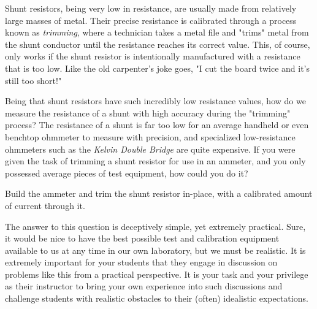 

Shunt resistors, being very low in resistance, are usually made from relatively large masses of metal.  Their precise resistance is calibrated through a process known as {\it trimming}, where a technician takes a metal file and "trims" metal from the shunt conductor until the resistance reaches its correct value.  This, of course, only works if the shunt resistor is intentionally manufactured with a resistance that is too low.  Like the old carpenter's joke goes, "I cut the board twice and it's still too short!"

Being that shunt resistors have such incredibly low resistance values, how do we measure the resistance of a shunt with high accuracy during the "trimming" process?  The resistance of a shunt is far too low for an average handheld or even benchtop ohmmeter to measure with precision, and specialized low-resistance ohmmeters such as the {\it Kelvin Double Bridge} are quite expensive.  If you were given the task of trimming a shunt resistor for use in an ammeter, and you only possessed average pieces of test equipment, how could you do it?







Build the ammeter and trim the shunt resistor in-place, with a calibrated amount of current through it.







The answer to this question is deceptively simple, yet extremely practical.  Sure, it would be nice to have the best possible test and calibration equipment available to us at any time in our own laboratory, but we must be realistic.  It is extremely important for your students that they engage in discussion on problems like this from a practical perspective.  It is your task and your privilege as their instructor to bring your own experience into such discussions and challenge students with realistic obstacles to their (often) idealistic expectations.



